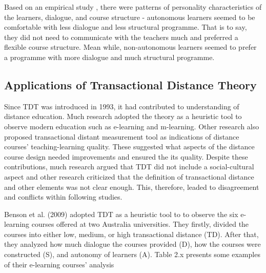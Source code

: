 Based on an empirical study \cite{moore1993theory}, there were patterns of personality characteristics of the learners, dialogue, and course structure - autonomous learners seemed to be comfortable with less dialogue and less structural programme. That is to say, they did not need to communicate with the teachers much and preferred a flexible course structure. Mean while, non-autonomous learners seemed to prefer a programme with more dialogue and much structural programme. 

\subsection{Applications of Transactional Distance Theory} 
Since TDT was introduced in 1993, it had contributed to understanding of distance education. Much research adopted the theory as a heuristic tool to observe modern education such as e-learning and m-learning. Other research also proposed transactional distant measurement tool as indications of distance courses' teaching-learning quality. These suggested what aspects of the distance course design needed improvements and ensured the its quality. Despite these contributions, much research argued that TDT did not include a social-cultural aspect and other research criticized that the definition of transactional distance and other elements was not clear enough. This, therefore, leaded to disagreement and conflicts within following studies. 

Benson et al. (2009) \cite{benson2009addressing} adopted TDT as a heuristic tool to to observe the six e-learning courses offered at two Australia universities. They firstly, divided the courses into either low, medium, or high transactional distance (TD). After that, they analyzed how much dialogue the courses provided (D), how the courses were constructed (S), and autonomy of learners (A). Table 2.x presents some examples of their e-learning courses' analysis 

